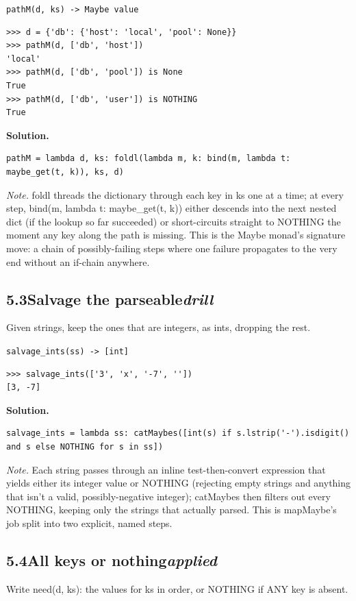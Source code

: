 \documentclass[10pt,letterpaper]{book}
\begin{document}
\noindent\texttt{pathM(d, ks) -> Maybe value}
\begin{lstlisting}[style=ex]
>>> d = {'db': {'host': 'local', 'pool': None}}
>>> pathM(d, ['db', 'host'])
'local'
>>> pathM(d, ['db', 'pool']) is None
True
>>> pathM(d, ['db', 'user']) is NOTHING
True
\end{lstlisting}
\noindent\textbf{Solution.}
\begin{lstlisting}[style=code]
pathM = lambda d, ks: foldl(lambda m, k: bind(m, lambda t: maybe_get(t, k)), ks, d)
\end{lstlisting}
\noindent\textit{Note.} foldl threads the dictionary through each key in ks one at a time; at every step, bind(m, lambda t: maybe\_get(t, k)) either descends into the next nested dict (if the lookup so far succeeded) or short-circuits straight to NOTHING the moment any key along the path is missing. This is the Maybe monad's signature move: a chain of possibly-failing steps where one failure propagates to the very end without an if-chain anywhere.

\subsection*{5.3\quad Salvage the parseable\hfill\textnormal{\textit{drill}}}
Given strings, keep the ones that are integers, as ints, dropping the rest.

\noindent\texttt{salvage\_ints(ss) -> [int]}
\begin{lstlisting}[style=ex]
>>> salvage_ints(['3', 'x', '-7', ''])
[3, -7]
\end{lstlisting}
\noindent\textbf{Solution.}
\begin{lstlisting}[style=code]
salvage_ints = lambda ss: catMaybes([int(s) if s.lstrip('-').isdigit() and s else NOTHING for s in ss])
\end{lstlisting}
\noindent\textit{Note.} Each string passes through an inline test-then-convert expression that yields either its integer value or NOTHING (rejecting empty strings and anything that isn't a valid, possibly-negative integer); catMaybes then filters out every NOTHING, keeping only the strings that actually parsed. This is mapMaybe's job split into two explicit, named steps.

\subsection*{5.4\quad All keys or nothing\hfill\textnormal{\textit{applied}}}
Write need(d, ks): the values for ks in order, or NOTHING if ANY key is absent.
\end{document}
